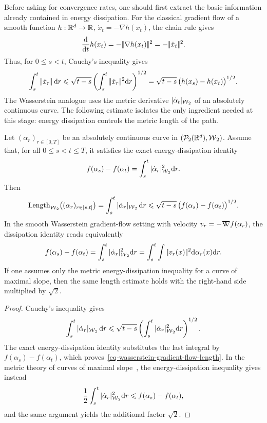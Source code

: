 Before asking for convergence rates, one should first extract the basic information already contained in energy dissipation. For the classical gradient flow of a smooth function $h:\mathbb{R}^d\to\mathbb{R}$, $\dot x_t=-\nabla h(x_t)$, the chain rule gives
\[
	\frac{\mathrm{d}}{\mathrm{d} t}h(x_t)
	=
	-|\!| \nabla h(x_t) |\!|^2
	=
	-|\!| \dot x_t |\!|^2.
\]
Thus, for $0\leq s<t$, Cauchy's inequality gives
\begin{equation}\label{eq-euclidean-gradient-flow-length}
	\int_s^t |\!| \dot x_r |\!|\,\mathrm{d} r
	\leqslant
	\sqrt{t-s}\left(\int_s^t|\!| \dot x_r |\!|^2\mathrm{d} r\right)^{1/2}
	=
	\sqrt{t-s}\,\bigl(h(x_s)-h(x_t)\bigr)^{1/2}.
\end{equation}
The Wasserstein analogue uses the metric derivative $|\dot\alpha_t|_{\operatorname{\mathcal{W}}_2}$ of an absolutely continuous curve. The following estimate isolates the only ingredient needed at this stage: energy dissipation controls the metric length of the path.

\begin{prop}\label{prop-gradient-flow-finite-length}
	Let $(\alpha_r)_{r\in[0,T]}$ be an absolutely continuous curve in $(\mathcal{P}_2(\mathbb{R}^d),\operatorname{\mathcal{W}}_2)$. Assume that, for all $0\leq s<t\leq T$, it satisfies the exact energy-dissipation identity
	\[
		f(\alpha_s)-f(\alpha_t)
		=
		\int_s^t |\dot\alpha_r|_{\operatorname{\mathcal{W}}_2}^2\mathrm{d} r.
	\]
	Then
	\begin{equation}\label{eq-wasserstein-gradient-flow-length}
		\operatorname{Length}_{\operatorname{\mathcal{W}}_2}\bigl((\alpha_r)_{r\in[s,t]}\bigr)
		=
		\int_s^t |\dot\alpha_r|_{\operatorname{\mathcal{W}}_2}\,\mathrm{d} r
		\leqslant
		\sqrt{t-s}\,\bigl(f(\alpha_s)-f(\alpha_t)\bigr)^{1/2}.
	\end{equation}
	In the smooth Wasserstein gradient-flow setting with velocity $v_r=-\mathord{\nabla\mkern-9.3mu\nabla} f(\alpha_r)$, the dissipation identity reads equivalently
	\[
		f(\alpha_s)-f(\alpha_t)
		=
		\int_s^t |\dot\alpha_r|_{\operatorname{\mathcal{W}}_2}^2\mathrm{d} r
		=
		\int_s^t\int |\!| v_r(x) |\!|^2\mathrm{d}\alpha_r(x)\mathrm{d} r.
	\]
	If one assumes only the metric energy-dissipation inequality for a curve of maximal slope, then the same length estimate holds with the right-hand side multiplied by $\sqrt2$.
\end{prop}

\begin{proof}
	Cauchy's inequality gives
	\[
		\int_s^t |\dot\alpha_r|_{\operatorname{\mathcal{W}}_2}\,\mathrm{d} r
		\leqslant
		\sqrt{t-s}
		\left(\int_s^t |\dot\alpha_r|_{\operatorname{\mathcal{W}}_2}^2\mathrm{d} r\right)^{1/2}.
	\]
	The exact energy-dissipation identity substitutes the last integral by $f(\alpha_s)-f(\alpha_t)$, which proves~\eqref{eq-wasserstein-gradient-flow-length}. In the metric theory of curves of maximal slope~\cite{ambrosio2006gradient,SantambrogioBook}, the energy-dissipation inequality gives instead
	\[
		\frac12\int_s^t |\dot\alpha_r|_{\operatorname{\mathcal{W}}_2}^2\mathrm{d} r
		\leqslant
		f(\alpha_s)-f(\alpha_t),
	\]
	and the same argument yields the additional factor $\sqrt2$.
\end{proof}

